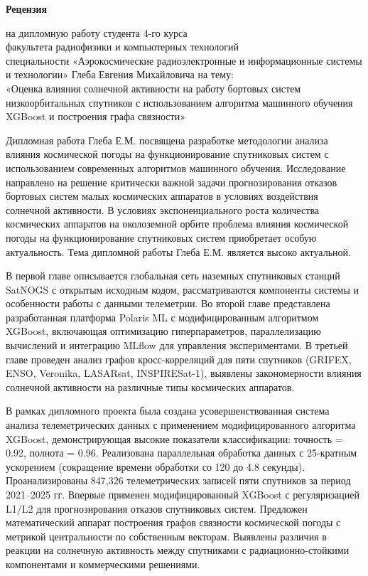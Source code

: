\documentclass[14pt, a4paper]{bsu_review}
\begin{document}
\begin{center}
\textbf{Рецензия}
\end{center}

\begin{center}
\noindent на дипломную работу студента 4-го курса\\
факультета радиофизики и компьютерных технологий\\
специальности «Аэрокосмические радиоэлектронные и информационные системы и технологии» Глеба Евгения Михайловича на тему:\\
«Оценка влияния солнечной активности на работу бортовых систем низкоорбитальных спутников с использованием алгоритма машинного обучения XGBoost и построения графа связности»
\end{center}

Дипломная работа Глеба Е.М. посвящена разработке методологии анализа влияния космической погоды на функционирование спутниковых систем с использованием современных алгоритмов машинного обучения. Исследование направлено на решение критически важной задачи прогнозирования отказов бортовых систем малых космических аппаратов в условиях воздействия солнечной активности. В условиях экспоненциального роста количества космических аппаратов на околоземной орбите проблема влияния космической погоды на функционирование спутниковых систем приобретает особую актуальность. Тема дипломной работы Глеба Е.М. является высоко актуальной.

В первой главе описывается глобальная сеть наземных спутниковых станций SatNOGS с открытым исходным кодом, рассматриваются компоненты системы и особенности работы с данными телеметрии. Во второй главе представлена разработанная платформа Polaris ML с модифицированным алгоритмом XGBoost, включающая оптимизацию гиперпараметров, параллелизацию вычислений и интеграцию MLflow для управления экспериментами. В третьей главе проведен анализ графов кросс-корреляций для пяти спутников (GRIFEX, ENSO, Veronika, LASARsat, INSPIRESat-1), выявлены закономерности влияния солнечной активности на различные типы космических аппаратов.

В рамках дипломного проекта была создана усовершенствованная система анализа телеметрических данных с применением модифицированного алгоритма XGBoost, демонстрирующая высокие показатели классификации: точность = 0.92, полнота = 0.96. Реализована параллельная обработка данных с 25-кратным ускорением (сокращение времени обработки со 120 до 4.8 секунды). Проанализированы 847,326 телеметрических записей пяти спутников за период 2021–2025 гг. Впервые применен модифицированный XGBoost с регуляризацией L1/L2 для прогнозирования отказов спутниковых систем. Предложен математический аппарат построения графов связности космической погоды с метрикой центральности по собственным векторам. Выявлены различия в реакции на солнечную активность между спутниками с радиационно-стойкими компонентами и коммерческими решениями.
\end{document}

